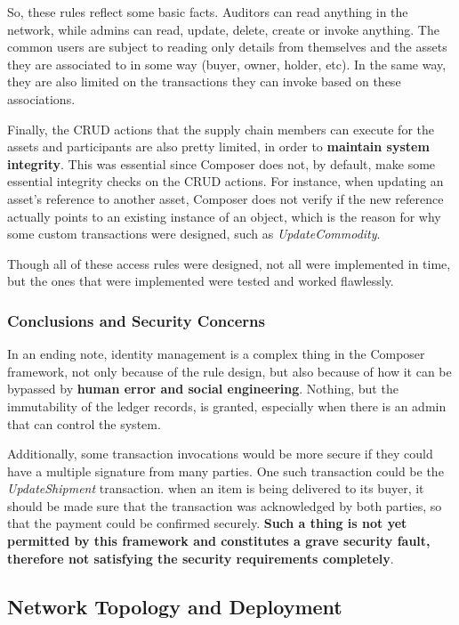 So, these rules reflect some basic facts. Auditors can read anything in the network, while admins can read, update, delete, create or invoke anything. The common users are subject to reading only details from themselves and the assets they are associated to in some way (buyer, owner, holder, etc). In the same way, they are also limited on the transactions they can invoke based on these associations. 

Finally, the CRUD actions that the supply chain members can execute for the assets and participants are also pretty limited, in order to \textbf{maintain system integrity}. This was essential since Composer does not, by default, make some essential integrity checks on the CRUD actions. For instance, when updating an asset's reference to another asset, Composer does not verify if the new reference actually points to an existing instance of an object, which is the reason for why some custom transactions were designed, such as \textit{UpdateCommodity}.

Though all of these access rules were designed, not all were implemented in time, but the ones that were implemented were tested and worked flawlessly.

\subsubsection*{Conclusions and Security Concerns }

In an ending note, identity management is a complex thing in the Composer framework, not only because of the rule design, but also because of how it can be bypassed by \textbf{human error and social engineering}. Nothing, but the immutability of the ledger records, is granted, especially when there is an admin that can control the system.

Additionally, some transaction invocations would be more secure if they could have a multiple signature from many parties. One such transaction could be the \textit{UpdateShipment} transaction. when an item is being delivered to its buyer, it should be made sure that the transaction was acknowledged by both parties, so that the payment could be confirmed securely. \textbf{Such a thing is not yet permitted by this framework and constitutes a grave security fault, therefore not satisfying the security requirements completely}.


\subsection{Network Topology and Deployment}

